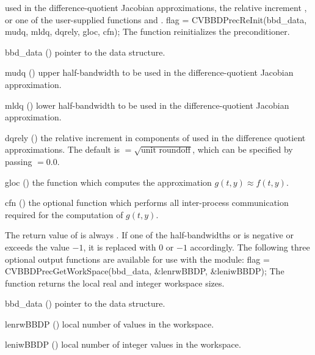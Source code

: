 used in the difference-quotient Jacobian approximations, the relative increment
, or one of the user-supplied functions  and .
{
  flag = CVBBDPrecReInit(bbd\_data, mudq, mldq, dqrely, gloc, cfn);
}
{
  The function  reinitializes the {\cvbbdpre} preconditioner.
}
{
  \begin{args}
  \item[bbd\_data] ()
    pointer to the {\cvbbdpre} data structure.
  \item[mudq] ()
    upper half-bandwidth to be used in the difference-quotient Jacobian approximation.
  \item[mldq] ()
    lower half-bandwidth to be used in the difference-quotient Jacobian approximation.
  \item[dqrely] ()
    the relative increment in components of  used in the difference quotient
    approximations.  The default is  $= \sqrt{\text{unit roundoff}}$,
    which can be specified by passing  $= 0.0$.
  \item[gloc] ()
    the {\C} function which computes the approximation $g(t,y) \approx f(t,y)$. 
  \item[cfn] ()
    the optional {\C} function which performs all inter-process communication required for
    the computation of $g(t,y)$.
  \end{args}
}
{
  The return value of  is always .
}
{
  If one of the half-bandwidths  or  is negative or
  exceeds the value $-1$, it is replaced with 0 or
  $-1$ accordingly.
}
The following three optional output functions are available for use with
the {\cvbbdpre} module:
{
  flag = CVBBDPrecGetWorkSpace(bbd\_data, \&lenrwBBDP, \&leniwBBDP);
}
{
  The function  returns the local
  {\cvbbdpre} real and integer workspace sizes.
}
{
  \begin{args}[lenrwBBDP]
  \item[bbd\_data] ()
    pointer to the {\cvbbdpre} data structure.
  \item[lenrwBBDP] ()
    local number of  values in the {\cvbbdpre} workspace.
  \item[leniwBBDP] ()
    local number of integer values in the {\cvbbdpre} workspace.
  \end{args}
}
